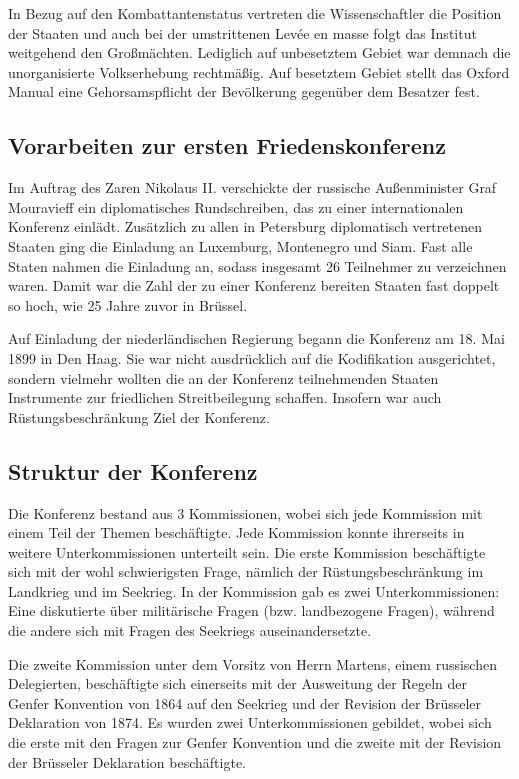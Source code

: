 \documentclass[12pt]{scrartcl}
\begin{document}
In Bezug auf den Kombattantenstatus vertreten die Wissenschaftler die Position der Staaten und auch bei der umstrittenen Levée en masse folgt das Institut weitgehend den Großmächten. Lediglich auf unbesetztem Gebiet war demnach die unorganisierte Volkserhebung rechtmäßig. Auf besetztem Gebiet stellt das Oxford Manual eine Gehorsamspflicht der Bevölkerung gegenüber dem Besatzer fest.\cite{Buss1992}

\subsection{Vorarbeiten zur ersten Friedenskonferenz}

Im Auftrag des Zaren Nikolaus II. verschickte der russische Außenminister Graf Mouravieff ein diplomatisches Rundschreiben, das zu einer internationalen Konferenz einlädt. Zusätzlich zu allen in Petersburg diplomatisch vertretenen Staaten ging die Einladung an Luxemburg, Montenegro und Siam. Fast alle Staten nahmen die Einladung an, sodass insgesamt 26 Teilnehmer zu verzeichnen waren. Damit war die Zahl der zu einer Konferenz bereiten Staaten fast doppelt so hoch, wie 25 Jahre zuvor in Brüssel.\cite{Buss1992}

Auf Einladung der niederländischen Regierung begann die Konferenz am 18. Mai 1899 in Den Haag. Sie war nicht ausdrücklich auf die Kodifikation ausgerichtet, sondern vielmehr wollten die an der Konferenz teilnehmenden Staaten Instrumente zur friedlichen Streitbeilegung schaffen. Insofern war auch Rüstungsbeschränkung Ziel der Konferenz.

\subsection{Struktur der Konferenz}

Die Konferenz bestand aus 3 Kommissionen, wobei sich jede Kommission mit einem Teil der Themen beschäftigte. Jede Kommission konnte ihrerseits in weitere Unterkommissionen unterteilt sein. Die erste Kommission beschäftigte sich mit der wohl schwierigsten Frage, nämlich der Rüstungsbeschränkung im Landkrieg und im Seekrieg. In der Kommission gab es zwei Unterkommissionen: Eine diskutierte über militärische Fragen (bzw. landbezogene Fragen), während die andere sich mit Fragen des Seekriegs auseinandersetzte.\cite{Scott1920}

Die zweite Kommission unter dem Vorsitz von Herrn Martens, einem russischen Delegierten, beschäftigte sich einerseits mit der Ausweitung der Regeln der Genfer Konvention von 1864 auf den Seekrieg und der Revision der Brüsseler Deklaration von 1874. Es wurden zwei Unterkommissionen gebildet, wobei sich die erste mit den Fragen zur Genfer Konvention und die zweite mit der Revision der Brüsseler Deklaration beschäftigte.\cite{Scott1920}
\end{document}

